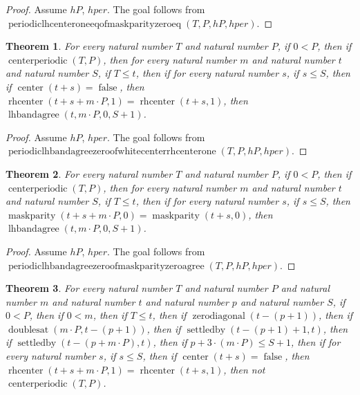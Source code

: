\documentclass[11pt]{article}
\newtheorem{theorem}{Theorem}[section]
\theoremstyle{definition}
\begin{document}
\begin{proof}
Assume \(hP\), \(hper\).
The goal follows from \(\operatorname{periodiclhcenteroneeqofmaskparityzeroeq}(T, P, hP, hper)\).
\end{proof}
\begin{theorem}
\label{ll:paper:periodic-lhbandagree-zero-of-white-center-rhcenter-one}
For every natural number \(T\) and natural number \(P\), if \(0 < P\), then if \(\operatorname{centerperiodic}(T, P)\), then for every natural number \(m\) and natural number \(t\) and natural number \(S\), if \(T \le t\), then if for every natural number \(s\), if \(s \le S\), then if \(\operatorname{center}(t + s) = \operatorname{false}\), then \(\operatorname{rhcenter}(t + s + m \cdot P, 1) = \operatorname{rhcenter}(t + s, 1)\), then \(\operatorname{lhbandagree}(t, m \cdot P, 0, S + 1)\).
\end{theorem}
\begin{proof}
Assume \(hP\), \(hper\).
The goal follows from \(\operatorname{periodiclhbandagreezeroofwhitecenterrhcenterone}(T, P, hP, hper)\).
\end{proof}
\begin{theorem}
\label{ll:paper:periodic-lhbandagree-zero-of-maskparity-zero-agree}
For every natural number \(T\) and natural number \(P\), if \(0 < P\), then if \(\operatorname{centerperiodic}(T, P)\), then for every natural number \(m\) and natural number \(t\) and natural number \(S\), if \(T \le t\), then if for every natural number \(s\), if \(s \le S\), then \(\operatorname{maskparity}(t + s + m \cdot P, 0) = \operatorname{maskparity}(t + s, 0)\), then \(\operatorname{lhbandagree}(t, m \cdot P, 0, S + 1)\).
\end{theorem}
\begin{proof}
Assume \(hP\), \(hper\).
The goal follows from \(\operatorname{periodiclhbandagreezeroofmaskparityzeroagree}(T, P, hP, hper)\).
\end{proof}
\begin{theorem}
\label{ll:paper:not-centerperiodic-of-white-center-rhcenter-one-doubles}
For every natural number \(T\) and natural number \(P\) and natural number \(m\) and natural number \(t\) and natural number \(p\) and natural number \(S\), if \(0 < P\), then if \(0 < m\), then if \(T \le t\), then if \(\operatorname{zerodiagonal}(t - (p + 1))\), then if \(\operatorname{doublesat}(m \cdot P, t - (p + 1))\), then if \(\operatorname{settledby}(t - (p + 1) + 1, t)\), then if \(\operatorname{settledby}(t - (p + m \cdot P), t)\), then if \(p + 3 \cdot (m \cdot P) \le S + 1\), then if for every natural number \(s\), if \(s \le S\), then if \(\operatorname{center}(t + s) = \operatorname{false}\), then \(\operatorname{rhcenter}(t + s + m \cdot P, 1) = \operatorname{rhcenter}(t + s, 1)\), then not \(\operatorname{centerperiodic}(T, P)\).
\end{theorem}
\end{document}
